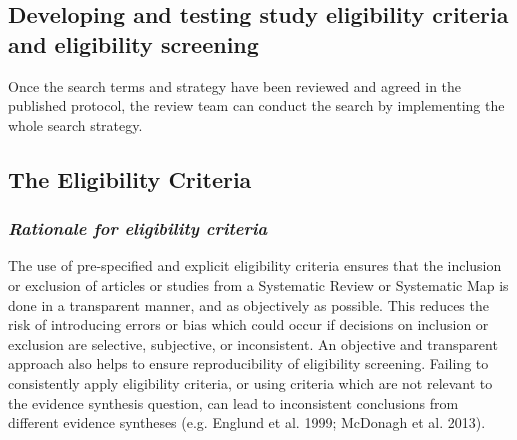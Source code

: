 \documentclass[
  letterpaper,
  DIV=11,
  numbers=noendperiod]{scrreprt}
\begin{document}
\subsection{Developing and testing study eligibility criteria and
eligibility
screening}\label{developing-and-testing-study-eligibility-criteria-and-eligibility-screening}

Once the search terms and strategy have been reviewed and agreed in the
published protocol, the review team can conduct the search by
implementing the whole search strategy.

\subsection{The Eligibility Criteria}\label{the-eligibility-criteria}

\subsubsection{\texorpdfstring{\emph{Rationale for eligibility
criteria}}{Rationale for eligibility criteria}}\label{rationale-for-eligibility-criteria}

The use of pre-specified and explicit eligibility criteria ensures that
the inclusion or exclusion of articles or studies from a Systematic
Review or Systematic Map is done in a transparent manner, and as
objectively as possible. This reduces the risk of introducing errors or
bias which could occur if decisions on inclusion or exclusion are
selective, subjective, or inconsistent. An objective and transparent
approach also helps to ensure reproducibility of eligibility screening.
Failing to consistently apply eligibility criteria, or using criteria
which are not relevant to the evidence synthesis question, can lead to
inconsistent conclusions from different evidence syntheses (e.g. Englund
et al. 1999; McDonagh et al. 2013).
\end{document}

